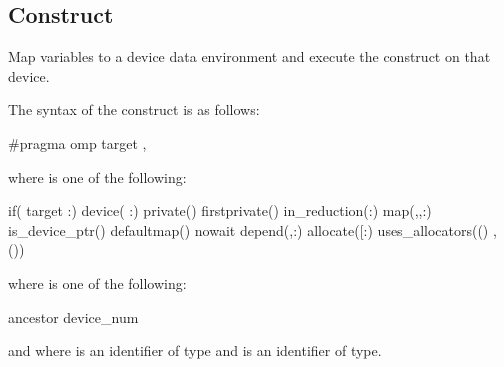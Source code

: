 \subsection{ Construct}
\label{subsec:target Construct}
\summary
Map variables to a device data environment and execute the construct on that device.

\syntax
\begin{ccppspecific}
The syntax of the  construct is as follows:

\begin{ompcPragma}
#pragma omp target \plc{[clause[ [},\plc{] clause] ... ] new-line}
\end{ompcPragma}

where  is one of the following:

\begin{indentedcodelist}
if(\plc{[} target :\plc{] scalar-expression})
device(\plc{[ device-modifier} :\plc{] integer-expression})
private()
firstprivate()
in_reduction(:)
map(\plc{[[map-type-modifier[},\plc{] [map-type-modifier[},\plc{] ...] map-type}:\plc{ ] locator-list})
is_device_ptr()
defaultmap()
nowait
depend(\plc{[depend-modifier},\plc{] dependence-type }:)
allocate([\plc{[allocator }:\plc{] list})
uses_allocators(\plc{allocator[}()\plc{]}
	       \plc{[},\plc{allocator[}()\plc{] ...]})
\end{indentedcodelist}

where  is one of the following:
\begin{indentedcodelist}
ancestor
device_num
\end{indentedcodelist}

and where  is an identifier of  type
and  is an identifier of 
 type.
\end{ccppspecific}

